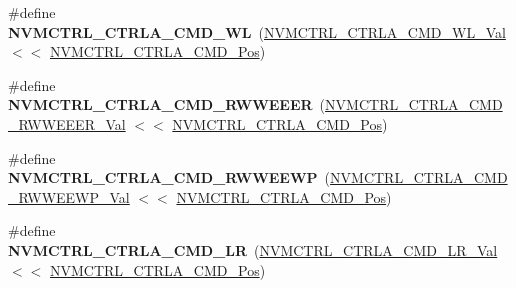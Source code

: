 \begin{DoxyCompactItemize}
\item 
\hypertarget{group___s_a_m_l21___n_v_m_c_t_r_l_ga1986c7240415a189e9b8d5e867830354}{}\#define {\bfseries N\+V\+M\+C\+T\+R\+L\+\_\+\+C\+T\+R\+L\+A\+\_\+\+C\+M\+D\+\_\+\+W\+L}~(\hyperlink{group___s_a_m_l21___n_v_m_c_t_r_l_ga16cd33731304aa0ed2db58be2f6fe599}{N\+V\+M\+C\+T\+R\+L\+\_\+\+C\+T\+R\+L\+A\+\_\+\+C\+M\+D\+\_\+\+W\+L\+\_\+\+Val}      $<$$<$ \hyperlink{group___s_a_m_l21___n_v_m_c_t_r_l_ga5346c6f8ba695f7cadb7f07bde6e25f8}{N\+V\+M\+C\+T\+R\+L\+\_\+\+C\+T\+R\+L\+A\+\_\+\+C\+M\+D\+\_\+\+Pos})\label{group___s_a_m_l21___n_v_m_c_t_r_l_ga1986c7240415a189e9b8d5e867830354}

\item 
\hypertarget{group___s_a_m_l21___n_v_m_c_t_r_l_ga7f1bc6847aff5a3ad6d1f247ca326aab}{}\#define {\bfseries N\+V\+M\+C\+T\+R\+L\+\_\+\+C\+T\+R\+L\+A\+\_\+\+C\+M\+D\+\_\+\+R\+W\+W\+E\+E\+E\+R}~(\hyperlink{group___s_a_m_l21___n_v_m_c_t_r_l_ga0e738a1a6d1d0bce5caad7fce29f2e18}{N\+V\+M\+C\+T\+R\+L\+\_\+\+C\+T\+R\+L\+A\+\_\+\+C\+M\+D\+\_\+\+R\+W\+W\+E\+E\+E\+R\+\_\+\+Val} $<$$<$ \hyperlink{group___s_a_m_l21___n_v_m_c_t_r_l_ga5346c6f8ba695f7cadb7f07bde6e25f8}{N\+V\+M\+C\+T\+R\+L\+\_\+\+C\+T\+R\+L\+A\+\_\+\+C\+M\+D\+\_\+\+Pos})\label{group___s_a_m_l21___n_v_m_c_t_r_l_ga7f1bc6847aff5a3ad6d1f247ca326aab}

\item 
\hypertarget{group___s_a_m_l21___n_v_m_c_t_r_l_gaa01b2c82b6913f800fb51b1cd8f85aca}{}\#define {\bfseries N\+V\+M\+C\+T\+R\+L\+\_\+\+C\+T\+R\+L\+A\+\_\+\+C\+M\+D\+\_\+\+R\+W\+W\+E\+E\+W\+P}~(\hyperlink{group___s_a_m_l21___n_v_m_c_t_r_l_ga6cbdf6599c74676de89836531389b7f1}{N\+V\+M\+C\+T\+R\+L\+\_\+\+C\+T\+R\+L\+A\+\_\+\+C\+M\+D\+\_\+\+R\+W\+W\+E\+E\+W\+P\+\_\+\+Val} $<$$<$ \hyperlink{group___s_a_m_l21___n_v_m_c_t_r_l_ga5346c6f8ba695f7cadb7f07bde6e25f8}{N\+V\+M\+C\+T\+R\+L\+\_\+\+C\+T\+R\+L\+A\+\_\+\+C\+M\+D\+\_\+\+Pos})\label{group___s_a_m_l21___n_v_m_c_t_r_l_gaa01b2c82b6913f800fb51b1cd8f85aca}

\item 
\hypertarget{group___s_a_m_l21___n_v_m_c_t_r_l_ga39f7730dc87114a29f25c569b9c78cbb}{}\#define {\bfseries N\+V\+M\+C\+T\+R\+L\+\_\+\+C\+T\+R\+L\+A\+\_\+\+C\+M\+D\+\_\+\+L\+R}~(\hyperlink{group___s_a_m_l21___n_v_m_c_t_r_l_ga30ddc4581bb1d3ba0a5dfebff3025ae6}{N\+V\+M\+C\+T\+R\+L\+\_\+\+C\+T\+R\+L\+A\+\_\+\+C\+M\+D\+\_\+\+L\+R\+\_\+\+Val}      $<$$<$ \hyperlink{group___s_a_m_l21___n_v_m_c_t_r_l_ga5346c6f8ba695f7cadb7f07bde6e25f8}{N\+V\+M\+C\+T\+R\+L\+\_\+\+C\+T\+R\+L\+A\+\_\+\+C\+M\+D\+\_\+\+Pos})\label{group___s_a_m_l21___n_v_m_c_t_r_l_ga39f7730dc87114a29f25c569b9c78cbb}


\end{DoxyCompactItemize}

